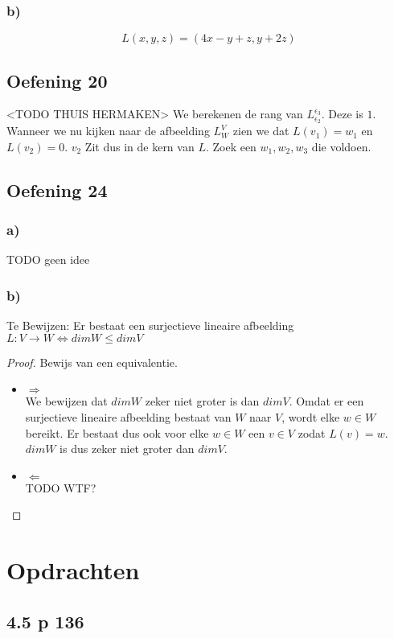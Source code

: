 \documentclass[lineaire_algebra_oplossingen.tex]{subfiles}
\begin{document}
\subsubsection*{b)}
\[
L(x,y,z) = (4x-y+z,y+2z)
\]

\subsection{Oefening 20}
<TODO THUIS HERMAKEN>
We berekenen de rang van $L_{\epsilon_2}^{\epsilon_3}$. Deze is $1$.
Wanneer we nu kijken naar de afbeelding $L_{W}^V$ zien we dat $L(v_1) = w_1$ en $L(v_2) = 0$. $v_2$ Zit dus in de kern van $L$.
Zoek een $w_1,w_2,w_3$ die voldoen.

\subsection{Oefening 24}
\subsubsection*{a)}
TODO geen idee
\subsubsection*{b)}
Te Bewijzen:
Er bestaat een surjectieve lineaire afbeelding $L:V\rightarrow W \Leftrightarrow dimW\le dimV$
\begin{proof}
Bewijs van een equivalentie.
\begin{itemize}
\item $\Rightarrow$\\
We bewijzen dat $dimW$ zeker niet groter is dan $dimV$. Omdat er een surjectieve lineaire afbeelding bestaat van $W$ naar $V$, wordt elke $w\in W$ bereikt. Er bestaat dus ook voor elke $w\in W$ een $v \in V$ zodat $L(v)=w$. $dimW$ is dus zeker niet groter dan $dimV$.
\item $\Leftarrow$\\
TODO WTF?

\end{itemize}
\end{proof}

\section{Opdrachten}

\subsection{4.5 p 136}
\end{document}

